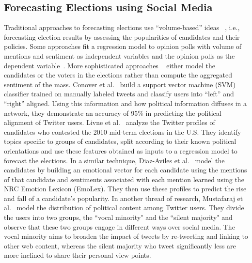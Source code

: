 \subsection{Forecasting Elections using Social Media}
Traditional approaches to forecasting elections use ``volume-based'' ideas
~\cite{tumasjan2010predicting,o2010tweets,saez2011total,bermingham2011using}, 
i.e., forecasting election results by assessing the popularities of candidates and their policies.
Some approaches fit a regression model to opinion 
polls with volume of mentions and sentiment as independent variables and the opinion 
polls as the dependent variable~\cite{o2010tweets,bermingham2011using}. 
More sophisticated approaches ~\cite{livne2011party,conover2011predicting,diaz2012taking}
either model the candidates or the voters in the elections rather than compute the aggregated sentiment of the mass.  
Conover et al.~\cite{conover2011predicting} build a support vector machine (SVM)
classifier trained on manually labeled tweets and classify users into ``left'' and ``right'' aligned.
Using this information and how political information diffuses in a network, they demonstrate an accuracy of 95\%  in 
predicting the political alignment of Twitter users.
Livne et al.~\cite{livne2011party} analyze the Twitter profiles of candidates who contested 
the 2010 mid-term elections in the U.S. 
They identify topics specific to groups of candidates, split according to their known political orientations and use 
these features obtained as inputs to a regression model to forecast the elections. 
In a similar technique, Diaz-Aviles et al.~\cite{diaz2012taking} model the candidates by building an emotional vector 
for each candidate using the mentions of that candidate and sentiments associated with each mention learned using 
the NRC Emotion Lexicon (EmoLex). 
They then use %
these profiles to predict the rise and fall of a candidate's popularity.
In another thread of research, Mustafaraj et al.~\cite{mustafaraj2011vocal} model the distribution of political content 
among Twitter users. 
They divide the users into two groups, the ``vocal minority" and the ``silent majority" and
observe that these two groups engage in different ways over social media.
The vocal minority aims to broaden the impact of tweets by re-tweeting and linking to other web content, whereas 
the silent majority who tweet significantly less are more inclined to share their personal view points.

